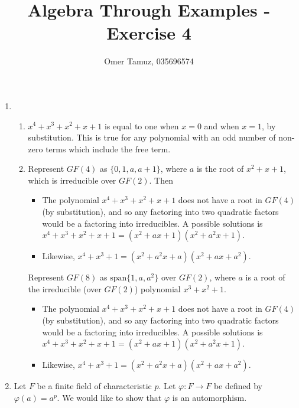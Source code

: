 \documentclass[11pt]{article} \usepackage{amssymb}
\renewcommand{\phi}{\varphi}
\begin{document}
\title{Algebra Through Examples - Exercise 4}

 \author{Omer Tamuz, 035696574}
\maketitle


\begin{enumerate}
\item 
  \begin{enumerate}
  \item 

    $x^4+x^3+x^2+x+1$ is equal to one when $x=0$ and when $x=1$, by
    substitution. This is true for any polynomial with an odd number
    of non-zero terms which include the free term.
  \item

    Represent $GF(4)$ as $\{0,1,a,a+1\}$, where $a$ is the
    root of $x^2+x+1$, which is irreducible over $GF(2)$. Then
    \begin{itemize}
    \item The polynomial $x^4+x^3+x^2+x+1$ does not have a root in $GF(4)$
      (by substitution), and so any factoring into two quadratic factors
      would be a factoring into irreducibles. A possible solutions is
      $x^4+x^3+x^2+x+1=(x^2+ax+1)(x^2+a^2x+1)$.

    \item 
      Likewise, $x^4+x^3+1=(x^2+a^2x+a)(x^2+ax+a^2)$.

    \end{itemize}

    Represent $GF(8)$ as $\mbox{span}\{1,a,a^2\}$ over $GF(2)$, where $a$
    is a root of the irreducible (over $GF(2)$) polynomial $x^3+x^2+1$.
    \begin{itemize}
    \item The polynomial $x^4+x^3+x^2+x+1$ does not have a root in $GF(4)$
      (by substitution), and so any factoring into two quadratic factors
      would be a factoring into irreducibles. A possible solutions is
      $x^4+x^3+x^2+x+1=(x^2+ax+1)(x^2+a^2x+1)$. 

    \item 
      Likewise, $x^4+x^3+1=(x^2+a^2x+a)(x^2+ax+a^2)$.

    \end{itemize}

  \end{enumerate}
\item

  Let $F$ be a finite field of characteristic $p$. Let $\phi:F\to F$ be defined
  by $\phi(a)=a^p$. We would like to show that $\phi$ is an automorphism. 



\end{enumerate}
\end{document}
